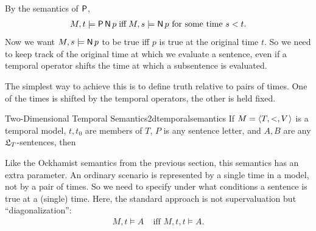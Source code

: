 By the semantics of $\operatorname{\mathsf{P}}$,%
\begin{align*}
  M,t \models \tP \tN p \;\text{iff} \;\text{$M,s \models \tN p$ for some time $s < t$}.
\end{align*}
Now we want $M,s\models \tN p$ to be true iff $p$ is true at the original time
$t$. So we need to keep track of the original time at which we evaluate a
sentence, even if a temporal operator shifts the time at which a subsentence is
evaluated.

The simplest way to achieve this is to define truth relative to pairs of
times. One of the times is shifted by the temporal operators, the other is held
fixed.

\begin{definition}{Two-Dimensional Temporal Semantics}{2dtemporalsemantics}
  If $\Mfr = \t{T,<,V}$ is a temporal model, $t,t_0$ are members of $T$, $P$ is
  any sentence letter, and $A,B$ are any $\mathfrak{L}_T$-sentences, then

  \medskip
  \begin{semantics}
  \end{semantics}
\end{definition}

Like the Ockhamist semantics from the previous section, this semantics has an
extra parameter. An ordinary scenario is represented by a single time in a
model, not by a pair of times. So we need to specify under what
conditions a sentence is true at a (single) time. Here, the standard approach is
not supervaluation but ``diagonalization'':
\begin{align*}
  M,t \models A & \;\text{iff $M,t,t \models A$}.
\end{align*}


